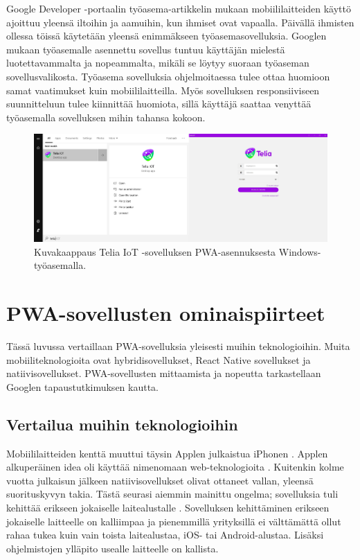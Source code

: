 \documentclass{tktltiki}
\begin{document}
Google Developer -portaalin työasema-artikkelin mukaan \cite{Google} mobiililaitteiden käyttö ajoittuu yleensä iltoihin ja aamuihin, kun ihmiset ovat vapaalla. Päivällä ihmisten ollessa töissä käytetään yleensä enimmäkseen työasemasovelluksia. Googlen mukaan työasemalle asennettu sovellus tuntuu käyttäjän mielestä luotettavammalta ja nopeammalta, mikäli se löytyy suoraan työaseman sovellusvalikosta. Työasema sovelluksia ohjelmoitaessa tulee ottaa huomioon samat vaatimukset kuin mobiililaitteilla. Myös sovelluksen responsiiviseen suunnitteluun tulee kiinnittää huomiota, sillä käyttäjä saattaa venyttää työasemalla sovelluksen mihin tahansa kokoon.

\begin{figure}[h]
  \centering
      \includegraphics[width=1.0\textwidth]{teliaiot_desktop_installation1.png}
  \caption{Kuvakaappaus Telia IoT -sovelluksen PWA-asennuksesta Windows-työasemalla.}
  \label{teliaiot_windowsissa_asennettuna}
\end{figure}

\clearpage

\section{PWA-sovellusten ominaispiirteet}

Tässä luvussa vertaillaan PWA-sovelluksia yleisesti muihin teknologioihin. Muita mobiiliteknologioita ovat hybridisovellukset, React Native sovellukset ja natiivisovellukset. PWA-sovellusten mittaamista ja nopeutta tarkastellaan Googlen tapaustutkimuksen kautta. 

\subsection{Vertailua muihin teknologioihin}

Mobiililaitteiden kenttä muuttui täysin Applen julkaistua iPhonen \cite{charland2011mobile}. Applen alkuperäinen idea oli käyttää nimenomaan web-teknologioita \cite{charland2011mobile}. Kuitenkin kolme vuotta julkaisun jälkeen natiivisovellukset olivat ottaneet vallan, yleensä suorituskyvyn takia. Tästä seurasi aiemmin mainittu ongelma; sovelluksia tuli kehittää erikseen jokaiselle laitealustalle \cite{charland2011mobile}. Sovelluksen kehittäminen erikseen jokaiselle laitteelle on kalliimpaa ja pienemmillä yrityksillä ei välttämättä ollut rahaa tukea kuin vain toista laitealustaa, iOS- tai Android-alustaa. Lisäksi ohjelmistojen ylläpito usealle laitteelle on kallista.
\end{document}
